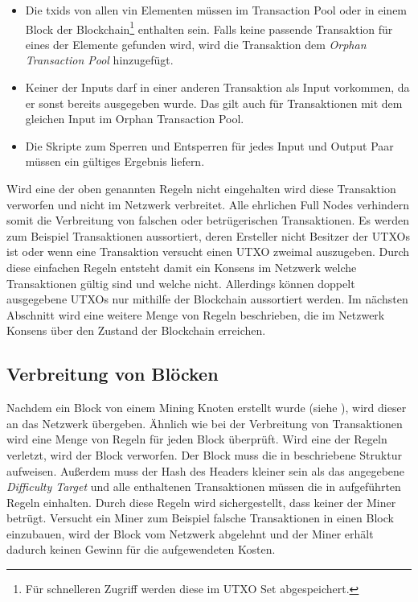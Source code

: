 \documentclass[ngerman,runningheads,a4paper]{llncs}[2018/03/10]
\begin{document}
\begin{itemize}

\item Die txids von allen vin Elementen müssen im Transaction Pool oder in einem Block der Blockchain\footnote{Für schnelleren Zugriff werden diese im UTXO Set abgespeichert.} enthalten sein. Falls keine passende Transaktion für eines der Elemente gefunden wird, wird die Transaktion dem \textit{Orphan Transaction Pool} hinzugefügt.

\item Keiner der Inputs darf in einer anderen Transaktion als Input vorkommen, da er sonst bereits ausgegeben wurde. Das gilt auch für Transaktionen mit dem gleichen Input im Orphan Transaction Pool.

\item Die Skripte zum Sperren und Entsperren für jedes Input und Output Paar müssen ein gültiges Ergebnis liefern.

\end{itemize}

Wird eine der oben genannten Regeln nicht eingehalten wird diese Transaktion verworfen und nicht im Netzwerk verbreitet. Alle ehrlichen Full Nodes verhindern somit die Verbreitung von falschen oder betrügerischen Transaktionen. Es werden zum Beispiel Transaktionen aussortiert, deren Ersteller nicht Besitzer der UTXOs ist oder wenn eine Transaktion versucht einen UTXO zweimal auszugeben. Durch diese einfachen Regeln entsteht damit ein Konsens im Netzwerk welche Transaktionen gültig sind und welche nicht. Allerdings können doppelt ausgegebene UTXOs nur mithilfe der Blockchain aussortiert werden. Im nächsten Abschnitt wird eine weitere Menge von Regeln beschrieben, die im Netzwerk Konsens über den Zustand der Blockchain erreichen.

\subsection{Verbreitung von Blöcken}\label{sec:blockverbreitung}

Nachdem ein Block von einem Mining Knoten erstellt wurde (siehe ), wird dieser an das Netzwerk übergeben. Ähnlich wie bei der Verbreitung von Transaktionen wird eine Menge von Regeln für jeden Block überprüft. Wird eine der Regeln verletzt, wird der Block verworfen. Der Block muss die in  beschriebene Struktur aufweisen. Außerdem muss der Hash des Headers kleiner sein als das angegebene \textit{Difficulty Target} und alle enthaltenen Transaktionen müssen die in  aufgeführten Regeln einhalten. Durch diese Regeln wird sichergestellt, dass keiner der Miner betrügt. Versucht ein Miner zum Beispiel falsche Transaktionen in einen Block einzubauen, wird der Block vom Netzwerk abgelehnt und der Miner erhält dadurch keinen Gewinn für die aufgewendeten Kosten.
\end{document}

